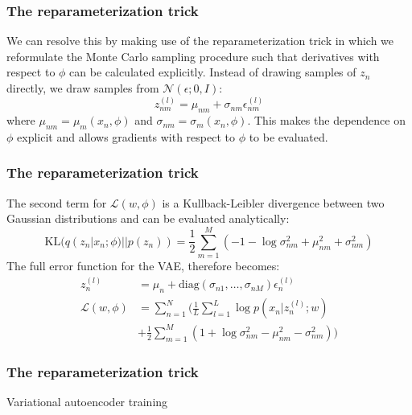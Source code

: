 \documentclass{beamer}
\begin{document}
\begin{frame}
    \frametitle{The reparameterization trick}
    We can resolve this by making use of the reparameterization trick in which we reformulate the Monte Carlo sampling procedure such that derivatives with respect to $\phi$ can be calculated explicitly. Instead of drawing samples of $z_{n}$ directly, we draw samples from $\mathcal{N}(\epsilon;0,I)$:
    \begin{equation*}
        z_{nm}^{(l)}=\mu_{nm}+\sigma_{nm}\epsilon_{nm}^{(l)}
    \end{equation*}
    where $\mu_{nm}=\mu_{m}(x_{n},\phi)$ and $\sigma_{nm}=\sigma_{m}(x_{n},\phi)$. This makes the dependence on $\phi$ explicit and allows gradients with respect to $\phi$ to be evaluated.
\end{frame}

\begin{frame}
    \frametitle{The reparameterization trick}
    The second term for $\mathcal{L}(w,\phi)$ is a Kullback-Leibler divergence between two Gaussian distributions and can be evaluated analytically:
    \begin{equation*}
        \mathrm{KL}(q(z_{n}|x_{n};\phi)||p(z_{n}))=\frac{1}{2}\sum_{m=1}^{M}(-1-\log\sigma^{2}_{nm}+\mu_{nm}^{2}+\sigma^{2}_{nm})
    \end{equation*}
    The full error function for the VAE, therefore becomes:
    \begin{align*}
        z_{n}^{(l)}&=\mu_{n}+\mathrm{diag}(\sigma_{n1},\hdots,\sigma_{nM})\epsilon_{n}^{(l)} \\
        \mathcal{L}(w,\phi)&=\sum_{n=1}^{N}(\frac{1}{L}\sum_{l=1}^{L}\log{}p(x_{n}|z_{n}^{(l)};w) \\
        &+\frac{1}{2}\sum_{m=1}^{M}(1+\log\sigma^{2}_{nm}-\mu_{nm}^{2}-\sigma^{2}_{nm}))
    \end{align*}
\end{frame}

\begin{frame}
    \frametitle{The reparameterization trick}
    \begin{algorithm}[H]
        \caption{Variational autoencoder training}
        \;
    \end{algorithm}
\end{frame}
\end{document}
